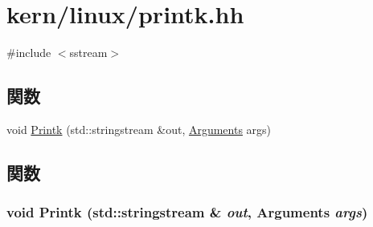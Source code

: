 \hypertarget{printk_8hh}{
\section{kern/linux/printk.hh}
\label{printk_8hh}
}
{\ttfamily \#include $<$sstream$>$}\par
\subsection*{関数}
\begin{DoxyCompactItemize}
\item 
void \hyperlink{printk_8hh_a2fa98cba43c0b6e2cc4f555e322f5bd2}{Printk} (std::stringstream \&out, \hyperlink{classArguments}{Arguments} args)
\end{DoxyCompactItemize}


\subsection{関数}
\hypertarget{printk_8hh_a2fa98cba43c0b6e2cc4f555e322f5bd2}{
\subsubsection[{Printk}]{\setlength{\rightskip}{0pt plus 5cm}void Printk (std::stringstream \& {\em out}, \/  {\bf Arguments} {\em args})}}
\label{printk_8hh_a2fa98cba43c0b6e2cc4f555e322f5bd2}
